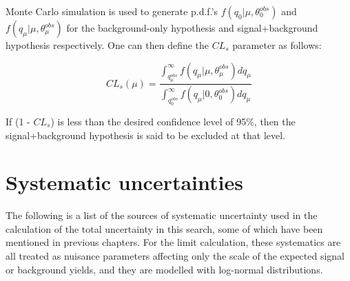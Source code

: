 Monte Carlo simulation is used to generate p.d.f.'s $f(q_{0}\vert\mu,\theta^{obs}_{0})$ and $f(q_{\mu}\vert\mu,\theta^{obs}_{\mu})$ for the background-only hypothesis and signal+background hypothesis respectively. One can then define the $CL_{s}$ parameter as follows:

\begin{equation}
CL_{s}(\mu) = \frac{\int_{q^{obs}_{\mu}}^{\infty} f(q_{\mu}\vert\mu,\theta^{obs}_{\mu}) dq_{\mu}}{\int_{q^{obs}_{0}}^{\infty} f(q_{\mu}\vert0,\theta^{obs}_{0}) dq_{\mu}}
\label{eq:CLS-def}
\end{equation}

If (1 - $CL_{s}$) is less than the desired confidence level of 95\%, then the signal+background hypothesis is said to be excluded at that level.

\section{Systematic uncertainties\label{sec:results-systematics}}

The following is a list of the sources of systematic uncertainty used in the calculation of the total uncertainty in this search, some of which have been mentioned in previous chapters. For the limit calculation, these systematics are all treated as nuisance parameters affecting only the scale of the expected signal or background yields, and they are modelled with log-normal distributions.

